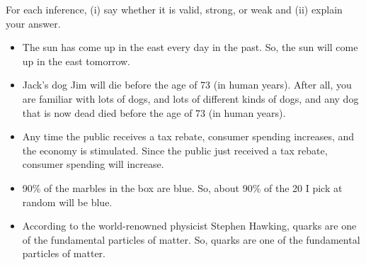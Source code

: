 \noindent For each inference, (i) say whether it is valid, strong, or weak and (ii) explain your answer.
\begin{itemize}
\item The sun has come up in the east every day in the past. So, the sun will come up in the east tomorrow.


\item Jack's dog Jim will die before the age of 73 (in human years). After all, you are familiar with lots of dogs, and lots of different kinds of dogs, and any dog that is now dead died before the age of 73 (in human years).


\item Any time the public receives a tax rebate, consumer spending increases, and the economy is stimulated. Since the public just received a tax rebate, consumer spending will increase.


\item  90\% of the marbles in the box are blue. So, about 90\% of the 20 I pick at random will be blue.


\item  According to the world-renowned physicist Stephen Hawking, quarks are one of the fundamental particles of matter. So, quarks are one of the fundamental particles of matter.


\end{itemize}
